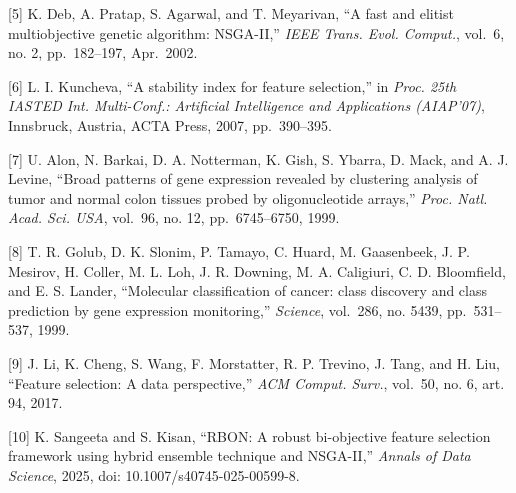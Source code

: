 \documentclass[conference]{IEEEtran}
\begin{document}
[5] K. Deb, A. Pratap, S. Agarwal, and T. Meyarivan, ``A fast and elitist multiobjective genetic algorithm: NSGA-II,'' \emph{IEEE Trans. Evol. Comput.}, vol.~6, no. 2, pp.~182--197, Apr.~2002.  

[6] L. I. Kuncheva, ``A stability index for feature selection,'' in \emph{Proc. 25th IASTED Int. Multi-Conf.: Artificial Intelligence and Applications (AIAP'07)}, Innsbruck, Austria, ACTA Press, 2007, pp.~390--395. 

[7] U. Alon, N. Barkai, D. A. Notterman, K. Gish, S. Ybarra, D. Mack, and A. J. Levine, ``Broad patterns of gene expression revealed by clustering analysis of tumor and normal colon tissues probed by oligonucleotide arrays,'' \emph{Proc. Natl. Acad. Sci. USA}, vol.~96, no. 12, pp.~6745--6750, 1999. 

[8] T. R. Golub, D. K. Slonim, P. Tamayo, C. Huard, M. Gaasenbeek, J. P. Mesirov, H. Coller, M. L. Loh, J. R. Downing, M. A. Caligiuri, C. D. Bloomfield, and E. S. Lander, ``Molecular classification of cancer: class discovery and class prediction by gene expression monitoring,'' \emph{Science}, vol.~286, no. 5439, pp.~531--537, 1999. 

[9] J. Li, K. Cheng, S. Wang, F. Morstatter, R. P. Trevino, J. Tang, and H. Liu, ``Feature selection: A data perspective,'' \emph{ACM Comput. Surv.}, vol.~50, no. 6, art. 94, 2017.  

[10] K. Sangeeta and S. Kisan, ``RBON: A robust bi-objective feature selection framework using hybrid ensemble technique and NSGA-II,'' \emph{Annals of Data Science}, 2025, doi: 10.1007/s40745-025-00599-8.  
\end{document}
